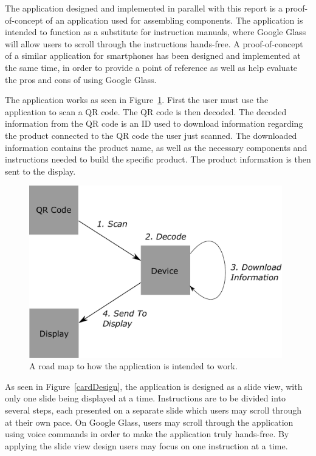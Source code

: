 The application designed and implemented in parallel with this report is a proof-of-concept of an application used for assembling components. The application is intended to function as a substitute for  instruction manuals, where Google Glass will allow users to scroll through the instructions hands-free. A proof-of-concept of a similar application for smartphones has been designed and implemented at the same time, in order to provide a point of reference as well as help evaluate the pros and cons of using Google Glass.

The application works as seen in Figure~\ref{projectmap}. First the user must use the application to scan a QR code. The QR code is then decoded. The decoded information from the QR code is an ID used to download information regarding the product connected to the QR code the user just scanned. The downloaded information contains the product name, as well as the necessary components and instructions needed to build the specific product. The product information is then sent to the display.

	\begin{figure}[ht!]
		\centering
		\includegraphics[width=110mm]{images/projectmap3}
		\caption{A road map to how the application is intended to work.}
		\label{projectmap}
	\end{figure}

As seen in Figure~\ref{cardDesign}, the application is designed as a slide view, with only one slide being displayed at a time. Instructions are to be divided into several steps, each presented on a separate slide which users may scroll through at their own pace. On Google Glass, users may scroll through the application using voice commands in order to make the application truly hands-free. By applying the slide view design users may focus on one instruction at a time. %

